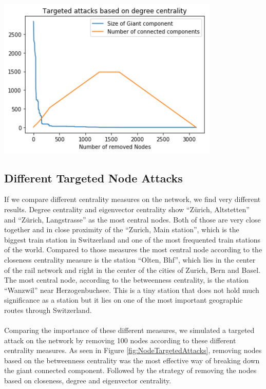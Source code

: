 \documentclass{Resources/netsci-project}
\begin{document}
\begin{center}
    \centering
    \includegraphics[width=300pt]{Resources/node_targeted_degree_attacks}
    \label{fig:NodeTargetedDegreeAttacks}
\end{center}


\subsection{Different Targeted Node Attacks}
If we compare different centrality measures on the network, we find very different results. Degree centrality and eigenvector centrality show “Zürich, Altstetten” and “Zürich, Langstrasse” as the most central nodes. Both of those are very close together and in close proximity of the “Zurich, Main station”, which is the biggest train station in Switzerland and one of the most frequented train stations of the world. Compared to those measures the most central node according to the closeness centrality measure is the station “Olten, Bhf”, which lies in the center of the rail network and right in the center of the cities of Zurich, Bern and Basel. The most central node, according to the betweenness centrality, is the station “Wanzwil” near Herzogenbuchsee. This is a tiny station that does not hold much significance as a station but it lies on one of the most important geographic routes through Switzerland.
\\~\\
Comparing the importance of these different measures, we simulated a targeted attack on the network by removing 100 nodes according to these different centrality measures. As seen in Figure \ref{fig:NodeTargetedAttacks}, removing nodes based on the betweenness centrality was the most effective way of breaking down the giant connected component. Followed by the strategy of removing the nodes based on closeness, degree and eigenvector centrality.
\end{document}
